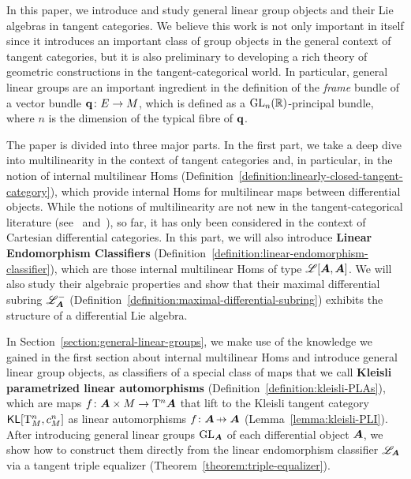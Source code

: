 \begin{content}
In this paper, we introduce and study general linear group objects and their Lie algebras in tangent categories. We believe this work is not only important in itself since it introduces an important class of group objects in the general context of tangent categories, but it is also preliminary to developing a rich theory of geometric constructions in the tangent-categorical world. In particular, general linear groups are an important ingredient in the definition of the \emph{frame} bundle of a vector bundle $\mathbf{q}\colon E\to M$, which is defined as a $\operatorname{GL}_n(\mathbb{\bm{R}})$-principal bundle, where $n$ is the dimension of the typical fibre of $\mathbf{q}$.
\end{content}

\begin{content}
The paper is divided into three major parts. In the first part, we take a deep dive into multilinearity in the context of tangent categories and, in particular, in the notion of internal multilinear Homs (Definition~\ref{definition:linearly-closed-tangent-category}), which provide internal Homs for multilinear maps between differential objects. While the notions of multilinearity are not new in the tangent-categorical literature (see~\cite{cruttwell:sector-forms-in-CDCs} and~\cite{lemay:jacobian}), so far, it has only been considered in the context of Cartesian differential categories. In this part, we will also introduce \textbf{Linear Endomorphism Classifiers} (Definition~\ref{definition:linear-endomorphism-classifier}), which are those internal multilinear Homs of type $\mathscr{L}[{\bm{A}},{\bm{A}}]$. We will also study their algebraic properties and show that their maximal differential subring $\mathscr{L}_{\bm{A}}^-$ (Definition~\ref{definition:maximal-differential-subring}) exhibits the structure of a differential Lie algebra.

In Section~\ref{section:general-linear-groups}, we make use of the knowledge we gained in the first section about internal multilinear Homs and introduce general linear group objects, as classifiers of a special class of maps that we call \textbf{Kleisli parametrized linear automorphisms} (Definition~\ref{definition:kleisli-PLAs}), which are maps $f\colon{\bm{A}}\times M\to\mathrm{T}^n{\bm{A}}$ that lift to the Kleisli tangent category $\mathsf{KL}[\mathrm{T}_M^n,c_M^n]$ as linear automorphisms $f\colon\A\nto\A$ (Lemma~\ref{lemma:kleisli-PLI}). After introducing general linear groups $\operatorname{GL}_{\bm{A}}$ of each differential object ${\bm{A}}$, we show how to construct them directly from the linear endomorphism classifier $\mathscr{L}_{\bm{A}}$ via a tangent triple equalizer (Theorem~\ref{theorem:triple-equalizer}).


\end{content}
